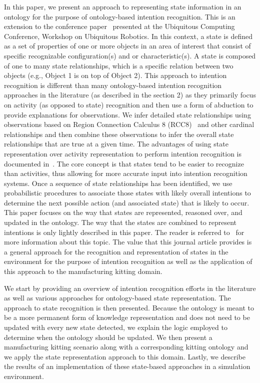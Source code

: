 \documentclass[preprint,12pt]{elsarticle}
\begin{document}
In this paper, we present an approach to representing state information in an ontology for the purpose of ontology-based intention recognition. This is an extension to the conference paper~\cite{SCHLENOFF.UBICOMP.2012} presented at the Ubiquitous Computing Conference, Workshop on Ubiquitous Robotics. In this context, a state is defined as a set of properties of one or more objects in an area of interest that consist of specific recognizable configuration(s) and or characteristic(s). A state is composed of one to many state relationships, which is a specific relation between two objects (e.g., Object 1 is on top of Object 2). This approach to intention recognition is different than many ontology-based intention recognition approaches in the literature (as described in the section 2) as they primarily focus on activity (as opposed to state) recognition and then use a form of abduction to provide explanations for observations. We infer detailed state relationships using observations based on Region Connection Calculus 8 (RCC8)~\cite{RANDELL.ICKRR.1992} and other cardinal relationships and then combine these observations to infer the overall state relationships that are true at a given time. The advantages of using state representation over activity representation to perform intention recognition is documented in~\cite{SCHLENOFF.ECDRM.2012}. The core concept is that states tend to be easier to recognize than activities, thus allowing for more accurate input into intention recognition systems. Once a sequence of state relationships has been identified, we use probabilistic procedures to associate those states with likely overall intentions to determine the next possible action (and associated state) that is likely to occur. This paper focuses on the way that states are represented, reasoned over, and updated in the ontology. The way that the states are combined to represent intentions is only lightly described in this paper. The reader is referred to~\cite{SCHLENOFF.ECDRM.2012} for more information about this topic. The value that this journal article provides is a general approach for the recognition and representation of states in the environment for the purpose of intention recognition as well as the application of this approach to the manufacturing kitting domain.

We start by providing an overview of intention recognition efforts in the literature as well as various approaches for ontology-based state representation. The approach to state recognition is then presented. Because the ontology is meant to be a more permanent form of knowledge representation and does not need to be updated with every new state detected, we explain the logic employed to determine when the ontology should be updated. We then present a manufacturing kitting scenario along with a corresponding kitting ontology and we apply the state representation approach to this domain. Lastly, we describe the results of an implementation of these state-based approaches in a simulation environment.
\end{document}
